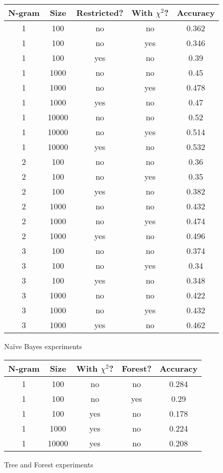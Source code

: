 \documentclass[11pt, onecolumn]{IEEEtran}
\begin{document}
\begin{figure}[H]
	\begin{center}
		\begin{tabular}{ | c | c | c | c | c |}
		\hline
		N-gram & Size & Restricted? & With $\chi^2$? & Accuracy\\
		\hline \hline
		1 & 100 & no & no & 0.362 \\
		\hline
		1 & 100 & no & yes & 0.346 \\
		\hline
		1 & 100 & yes & no & 0.39 \\
		\hline
		1 & 1000 & no & no & 0.45 \\
		\hline
		1 & 1000 & no & yes & 0.478 \\
		\hline
		1 & 1000 & yes & no & 0.47 \\
		\hline
		1 & 10000 & no & no & 0.52 \\
		\hline
		1 & 10000 & no & yes & 0.514 \\
		\hline
		1 & 10000 & yes & no & 0.532 \\
		\hline
		2 & 100 & no & no & 0.36 \\
		\hline
		2 & 100 & no & yes & 0.35 \\
		\hline
		2 & 100 & yes & no & 0.382 \\
		\hline
		2 & 1000 & no & no & 0.432 \\
		\hline
		2 & 1000 & no & yes & 0.474 \\
		\hline
		2 & 1000 & yes & no & 0.496 \\
		\hline
		3 & 100 & no & no & 0.374 \\
		\hline
		3 & 100 & no & yes & 0.34 \\
		\hline
		3 & 100 & yes & no & 0.348 \\
		\hline
		3 & 1000 & no & no & 0.422 \\
		\hline
		3 & 1000 & no & yes & 0.432 \\
		\hline
		3 & 1000 & yes & no & 0.462 \\
		\hline
		\end{tabular}
	\end{center}
\caption{Na\"{i}ve Bayes experiments}
\label{nbresults}
\end{figure}
\begin{figure}[H]
	\begin{center}
		\begin{tabular}{ | c | c | c | c | c |}
		\hline
		N-gram & Size & With $\chi^2$? & Forest? & Accuracy\\
		\hline \hline
		1 & 100 & no & no & 0.284 \\
		\hline
		1 & 100 & no & yes & 0.29 \\
		\hline
		1 & 100 & yes & no & 0.178 \\
		\hline
		1 & 1000 & yes & no & 0.224 \\
		\hline
		1 & 10000 & yes & no & 0.208 \\
		\hline
		\end{tabular}
	\end{center}
\caption{Tree and Forest experiments}
\label{nbresults}
\end{figure}
\end{document}

